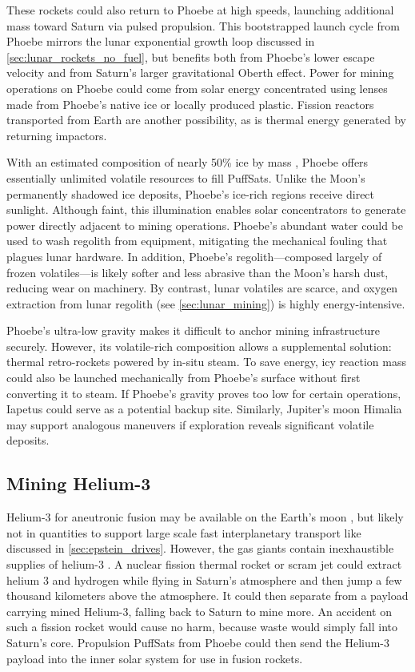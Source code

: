 \documentclass{article}
\begin{document}
These rockets could also return to Phoebe at high speeds, launching additional mass toward Saturn via pulsed propulsion. This bootstrapped launch cycle from Phoebe mirrors the lunar exponential growth loop discussed in \autoref{sec:lunar_rockets_no_fuel}, but benefits both from Phoebe’s lower escape velocity and from Saturn's larger gravitational Oberth effect. Power for mining operations on Phoebe could come from solar energy concentrated using lenses made from Phoebe's native ice or locally produced plastic. Fission reactors transported from Earth are another possibility, as is thermal energy generated by returning impactors.

With an estimated composition of nearly 50\% ice by mass \cite{phoebe}, Phoebe offers essentially unlimited volatile resources to fill PuffSats. Unlike the Moon’s permanently shadowed ice deposits, Phoebe’s ice-rich regions receive direct sunlight. Although faint, this illumination enables solar concentrators to generate power directly adjacent to mining operations. Phoebe’s abundant water could be used to wash regolith from equipment, mitigating the mechanical fouling that plagues lunar hardware. In addition, Phoebe’s regolith—composed largely of frozen volatiles—is likely softer and less abrasive than the Moon’s harsh dust, reducing wear on machinery. By contrast, lunar volatiles are scarce, and oxygen extraction from lunar regolith (see \autoref{sec:lunar_mining}) is highly energy-intensive.

Phoebe’s ultra-low gravity makes it difficult to anchor mining infrastructure securely. However, its volatile-rich composition allows a supplemental solution: thermal retro-rockets powered by in-situ steam. To save energy, icy reaction mass could also be launched mechanically from Phoebe’s surface without first converting it to steam. If Phoebe’s gravity proves too low for certain operations, Iapetus could serve as a potential backup site. Similarly, Jupiter’s moon Himalia may support analogous maneuvers if exploration reveals significant volatile deposits.

\subsection{Mining Helium-3} \label{sec:mining_helium_3}
Helium-3 for aneutronic fusion may be available on the Earth's moon \cite{esa_helium3_mining}, but likely not in quantities to support large scale fast interplanetary transport like discussed in \autoref{sec:epstein_drives}.   However, the gas giants contain inexhaustible supplies of helium-3 \cite{palaszewski2005atmospheric}.   A nuclear fission thermal rocket or scram jet could extract helium 3 and hydrogen while flying in Saturn's atmosphere and then jump a few thousand kilometers above the atmosphere.  It could then separate from a payload carrying mined Helium-3, falling back to Saturn to mine more.  An accident on such a fission rocket would cause no harm, because waste would simply fall into Saturn's core. Propulsion PuffSats from Phoebe could then send the Helium-3 payload into the inner solar system for use in fusion rockets.  
\end{document}
